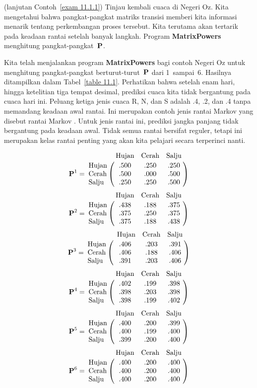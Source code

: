 \begin{example}\label{exam 11.1.1.5} (lanjutan Contoh~\ref{exam 11.1.1})
Tinjau kembali cuaca di Negeri Oz. Kita mengetahui bahwa pangkat-pangkat matriks
transisi memberi kita informasi menarik tentang perkembangan proses tersebut.
Kita terutama akan tertarik pada keadaan rantai setelah banyak langkah. Program
{\bf MatrixPowers} menghitung pangkat-pangkat~${\mbox{\bf P}\/}$.
\par
Kita telah menjalankan program {\bf MatrixPowers} bagi contoh Negeri Oz untuk
menghitung pangkat-pangkat berturut-turut~${\mbox{\bf P}\/}$ dari 1~sampai~6. Hasilnya
ditampilkan dalam Tabel~\ref{table 11.1}. Perhatikan bahwa setelah enam hari,
hingga ketelitian tiga tempat desimal, prediksi cuaca kita tidak bergantung pada
cuaca hari ini. Peluang ketiga jenis cuaca R, N, dan S adalah .4, .2, dan .4
tanpa memandang keadaan awal rantai. Ini merupakan contoh jenis rantai Markov
yang disebut rantai Markov . Untuk jenis rantai ini, prediksi
jangka panjang tidak bergantung pada keadaan awal. Tidak semua rantai bersifat
reguler, tetapi ini merupakan kelas rantai penting yang akan kita pelajari
secara terperinci nanti.
\begin{table}
\centering
$$
\mat{P}^1  = \bordermatrix{
            &\mbox{Hujan}&\mbox{Cerah}&\mbox{Salju} \cr
\mbox{Hujan} & .500      & .250      & .250 \cr
\mbox{Cerah} & .500      & .000      & .500 \cr
\mbox{Salju} & .250      & .250      & .500 \cr}
$$
$$  
\mat {P}^2  = \bordermatrix{
            &\mbox{Hujan}&\mbox{Cerah}&\mbox{Salju} \cr
\mbox{Hujan} & .438     & .188       & .375 \cr
\mbox{Cerah} & .375     & .250       & .375 \cr
\mbox{Salju} & .375     & .188       & .438 \cr}
$$
$$
\mat {P}^3  = \bordermatrix{
            &\mbox{ Hujan}&\mbox{Cerah} &\mbox{Salju} \cr
\mbox{Hujan} & .406       & .203       & .391 \cr
\mbox{Cerah} & .406       & .188       & .406 \cr
\mbox{Salju} & .391       & .203       & .406 \cr}
$$
$$  
\mat {P}^4  = \bordermatrix{
            &\mbox{Hujan}&\mbox{Cerah}&\mbox{Salju} \cr
\mbox{Hujan} & .402      & .199      & .398 \cr
\mbox{Cerah} & .398      & .203      & .398 \cr
\mbox{Salju} & .398      & .199      & .402 \cr}
$$
$$
\mat {P}^5  = \bordermatrix{
           &\mbox{Hujan}&\mbox{Cerah}&\mbox{Salju} \cr
\mbox{Hujan} & .400     & .200     & .399 \cr
\mbox{Cerah} & .400     & .199     & .400 \cr
\mbox{Salju} & .399     & .200     & .400 \cr}
$$
$$  
\mat {P}^6  = \bordermatrix{
           &\mbox{Hujan}&\mbox{Cerah}&\mbox{Salju} \cr
\mbox{Hujan} & .400     & .200     & .400 \cr
\mbox{Cerah} & .400     & .200     & .400 \cr
\mbox{Salju} & .400     & .200     & .400 \cr}
$$
\caption{Pangkat-pangkat matriks transisi Negeri Oz.}
\label{table 11.1}
\end{table}
\end{example}

